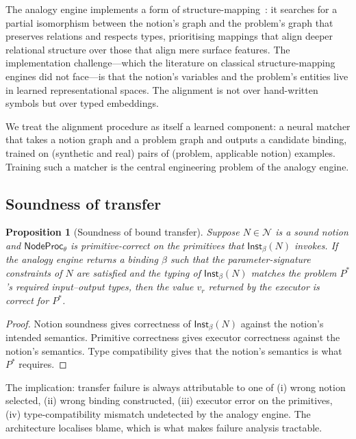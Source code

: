 \documentclass[11pt,a4paper]{article}
\theoremstyle{plain}
\newtheorem{proposition}[theorem]{Proposition}
\theoremstyle{definition}
\theoremstyle{remark}
\newcommand{\Notions}{\mathcal{N}}
\newcommand{\NodeProc}{\mathsf{NodeProc}}
\newcommand{\Inst}{\mathsf{Inst}}
\begin{document}
The analogy engine implements a form of structure-mapping~\cite{gentner1983structure}: it searches for a partial isomorphism between the notion's graph and the problem's graph that preserves relations and respects types, prioritising mappings that align deeper relational structure over those that align mere surface features. The implementation challenge---which the literature on classical structure-mapping engines did not face---is that the notion's variables and the problem's entities live in learned representational spaces. The alignment is not over hand-written symbols but over typed embeddings.

We treat the alignment procedure as itself a learned component: a neural matcher that takes a notion graph and a problem graph and outputs a candidate binding, trained on (synthetic and real) pairs of (problem, applicable notion) examples. Training such a matcher is the central engineering problem of the analogy engine.

\subsection{Soundness of transfer}

\begin{proposition}[Soundness of bound transfer]
\label{prop:transfer-soundness}
Suppose $N \in \Notions$ is a sound notion and $\NodeProc_\theta$ is primitive-correct on the primitives that $\Inst_\beta(N)$ invokes. If the analogy engine returns a binding $\beta$ such that the parameter-signature constraints of $N$ are satisfied and the typing of $\Inst_\beta(N)$ matches the problem $P^\ast$'s required input--output types, then the value $v_r$ returned by the executor is correct for $P^\ast$.
\end{proposition}

\begin{proof}
Notion soundness gives correctness of $\Inst_\beta(N)$ against the notion's intended semantics. Primitive correctness gives executor correctness against the notion's semantics. Type compatibility gives that the notion's semantics is what $P^\ast$ requires.
\end{proof}

The implication: transfer failure is always attributable to one of (i) wrong notion selected, (ii) wrong binding constructed, (iii) executor error on the primitives, (iv) type-compatibility mismatch undetected by the analogy engine. The architecture localises blame, which is what makes failure analysis tractable.
\end{document}
